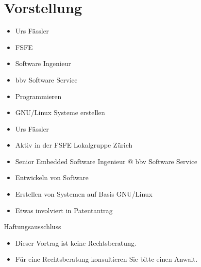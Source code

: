 \section{Vorstellung}
\begin{frame}
	\begin{itemize}
		\item Urs Fässler
		\item FSFE
		\item Software Ingenieur
		\item bbv Software Service
		\item Programmieren
		\item GNU/Linux Systeme erstellen
	\end{itemize}
\end{frame}
\note
{
	\begin{itemize}
		\item Urs Fässler
		\item Aktiv in der FSFE Lokalgruppe Zürich
		\item Senior Embedded Software Ingenieur @ bbv Software Service
		\item Entwickeln von Software
		\item Erstellen von Systemen auf Basis GNU/Linux
		\item Etwas involviert in Patentantrag
	\end{itemize}
}

\begin{frame}{Haftungsausschluss}
	\begin{itemize}
		\item Dieser Vortrag ist keine Rechtsberatung.
		\item Für eine Rechtsberatung konsultieren Sie bitte einen Anwalt.
	\end{itemize}
\end{frame}

